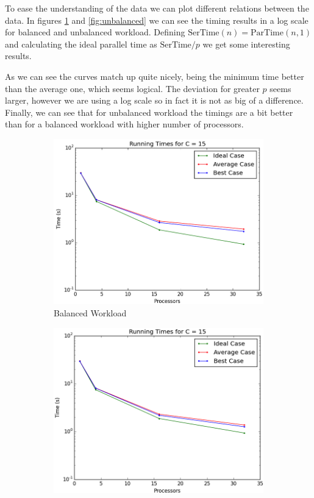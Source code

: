 \documentclass[a4paper]{article}
\begin{document}
    To ease the understanding of the data we can plot different relations between the data. In figures \ref{fig:balanced} and \ref{fig:unbalanced} we can see the timing results in a log scale for balanced and unbalanced workload. Defining $\text{SerTime}(n) = \text{ParTime}(n,1)$ and calculating the ideal parallel time as $\text{SerTime}/p$ we get some interesting results.

    As we can see the curves match up quite nicely, being the minimum time better than the average one, which seems logical. The deviation for greater $p$ seems larger, however we are using a log scale so in fact it is not as big of a difference. Finally, we can see that for unbalanced workload the timings are a bit better than for a balanced workload with higher number of processors.

    \begin{figure}[htp!]
      \centering
      \begin{subfigure}{.5\textwidth}
        \centering
        \includegraphics[width=.93\textwidth]{../2 Analysis/15_.png}
        \caption{Balanced Workload}
        \label{fig:balanced}
      \end{subfigure}%
      \begin{subfigure}{.5\textwidth}
        \centering
        \includegraphics[width=.93\textwidth]{../2 Analysis/15_unfair.png}

\end{subfigure}
\end{figure}
\end{document}
